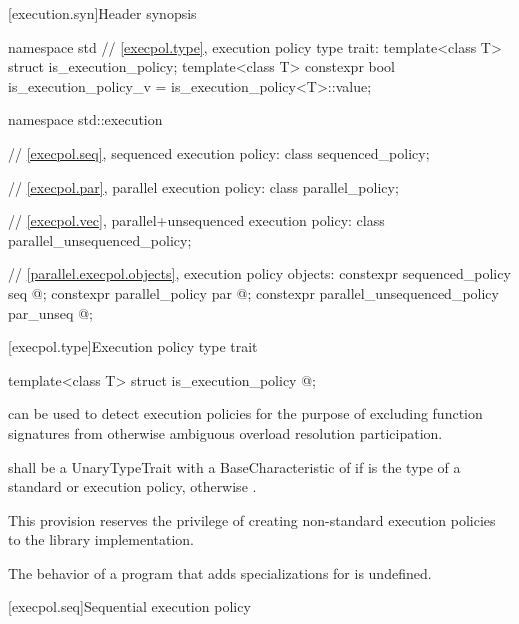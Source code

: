 %
[execution.syn]{Header  synopsis}
\begin{codeblock}
namespace std {
  // \ref{execpol.type}, execution policy type trait:
  template<class T> struct is_execution_policy;
  template<class T> constexpr bool is_execution_policy_v = is_execution_policy<T>::value;
}

namespace std::execution {
  // \ref{execpol.seq}, sequenced execution policy:
  class sequenced_policy;

  // \ref{execpol.par}, parallel execution policy:
  class parallel_policy;

  // \ref{execpol.vec}, parallel+unsequenced execution policy:
  class parallel_unsequenced_policy;

  // \ref{parallel.execpol.objects}, execution policy objects:
  constexpr sequenced_policy            seq{ @\unspec@ };
  constexpr parallel_policy             par{ @\unspec@ };
  constexpr parallel_unsequenced_policy par_unseq{ @\unspec@ };
}
\end{codeblock}

[execpol.type]{Execution policy type trait}

%
\begin{itemdecl}
template<class T> struct is_execution_policy { @\seebelow@ };
\end{itemdecl}

\begin{itemdescr}
\pnum
{} can be used to detect execution policies for the
purpose of excluding function signatures from otherwise ambiguous overload
resolution participation.

\pnum
{} shall be a UnaryTypeTrait with a
BaseCharacteristic of  if  is the type of a standard
or 
execution policy, otherwise .

\begin{note}
This provision reserves the privilege of creating non-standard execution
policies to the library implementation.
\end{note}

\pnum
The behavior of a program that adds specializations for
 is undefined.
\end{itemdescr}

[execpol.seq]{Sequential execution policy}


